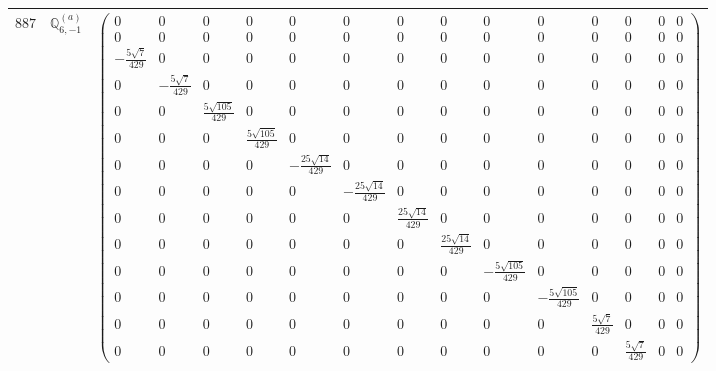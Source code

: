 \documentclass[fleqn,8pt,landscape]{jsarticle}
\begin{document}
\begin{center}
\begin{longtable}{ccc}
$ 887 $ & $ \mathbb{Q}_{6,-1}^{(a)} $ & $ \begin{pmatrix} 0 & 0 & 0 & 0 & 0 & 0 & 0 & 0 & 0 & 0 & 0 & 0 & 0 & 0 \\ 0 & 0 & 0 & 0 & 0 & 0 & 0 & 0 & 0 & 0 & 0 & 0 & 0 & 0 \\ - \frac{5 \sqrt{7}}{429} & 0 & 0 & 0 & 0 & 0 & 0 & 0 & 0 & 0 & 0 & 0 & 0 & 0 \\ 0 & - \frac{5 \sqrt{7}}{429} & 0 & 0 & 0 & 0 & 0 & 0 & 0 & 0 & 0 & 0 & 0 & 0 \\ 0 & 0 & \frac{5 \sqrt{105}}{429} & 0 & 0 & 0 & 0 & 0 & 0 & 0 & 0 & 0 & 0 & 0 \\ 0 & 0 & 0 & \frac{5 \sqrt{105}}{429} & 0 & 0 & 0 & 0 & 0 & 0 & 0 & 0 & 0 & 0 \\ 0 & 0 & 0 & 0 & - \frac{25 \sqrt{14}}{429} & 0 & 0 & 0 & 0 & 0 & 0 & 0 & 0 & 0 \\ 0 & 0 & 0 & 0 & 0 & - \frac{25 \sqrt{14}}{429} & 0 & 0 & 0 & 0 & 0 & 0 & 0 & 0 \\ 0 & 0 & 0 & 0 & 0 & 0 & \frac{25 \sqrt{14}}{429} & 0 & 0 & 0 & 0 & 0 & 0 & 0 \\ 0 & 0 & 0 & 0 & 0 & 0 & 0 & \frac{25 \sqrt{14}}{429} & 0 & 0 & 0 & 0 & 0 & 0 \\ 0 & 0 & 0 & 0 & 0 & 0 & 0 & 0 & - \frac{5 \sqrt{105}}{429} & 0 & 0 & 0 & 0 & 0 \\ 0 & 0 & 0 & 0 & 0 & 0 & 0 & 0 & 0 & - \frac{5 \sqrt{105}}{429} & 0 & 0 & 0 & 0 \\ 0 & 0 & 0 & 0 & 0 & 0 & 0 & 0 & 0 & 0 & \frac{5 \sqrt{7}}{429} & 0 & 0 & 0 \\ 0 & 0 & 0 & 0 & 0 & 0 & 0 & 0 & 0 & 0 & 0 & \frac{5 \sqrt{7}}{429} & 0 & 0 \end{pmatrix} $ \\ \hline

\end{longtable}
\end{center}
\end{document}
